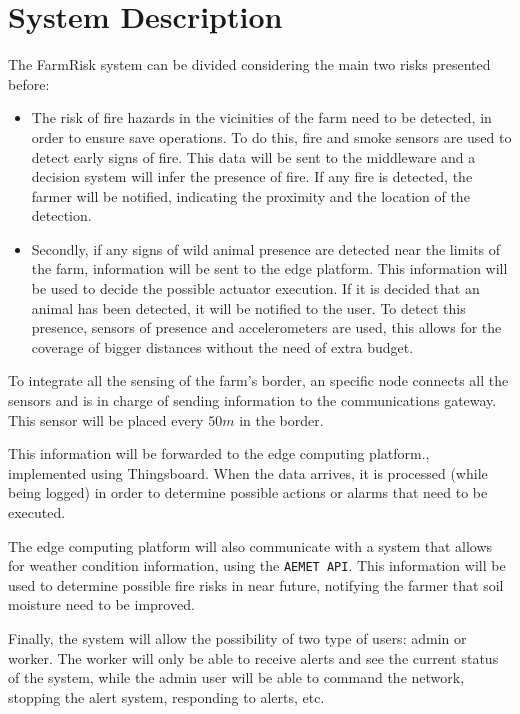 \section{System Description}

The FarmRisk system can be divided considering the main two risks presented before:

\begin{itemize}
    \item The risk of fire hazards in the vicinities of the farm need to be detected, in order to ensure save operations. To do this, fire and smoke sensors are used to detect early signs of fire. This data will be 
    sent to the middleware and a decision system will infer the presence of fire. If any fire is detected, the farmer will be notified, indicating the proximity and the location of 
    the detection.
    \item Secondly, if any signs of wild animal presence are detected near the limits of the farm, information will be sent to the edge platform. This information will be used to decide the possible actuator execution. 
    If it is decided that an animal has been detected, it will be notified to the user. To detect this presence, sensors of presence and accelerometers are used, this allows for the coverage of bigger distances without the 
    need of extra budget.
\end{itemize}

To integrate all the sensing of the farm's border, an specific node connects all the sensors and is in charge of sending information to the communications gateway. This sensor will be placed every $50m$ in the border.

This information will be forwarded to the edge computing platform., implemented using Thingsboard. When the data arrives, it is processed (while being logged) in order to determine possible actions or alarms that need to be 
executed.

The edge computing platform will also communicate with a system that allows for weather condition information, using the \texttt{AEMET API}\cite{AEMETOpenDataAgencia}. This information will be used to determine possible 
fire risks in near future, notifying the farmer that soil moisture need to be improved.

Finally, the system will allow the possibility of two type of users: admin or worker. The worker will only be able to receive alerts and see the current status of the system, while the admin user will be able to command the 
network, stopping the alert system, responding to alerts, etc.


